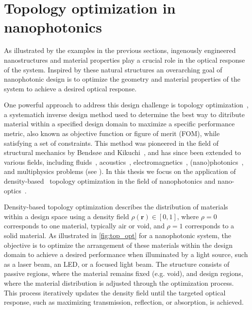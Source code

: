

\section{Topology optimization in nanophotonics}

As illustrated by the examples in the previous sections, ingenously engineered nanostructures and material properties play a crucial role in the
optical response of the system. Inspired by these natural structures an overarching goal of nanophotonic
design is to optimize the geometry and material properties of the system to achieve a desired
optical response.

One powerful approach to address this design challenge is topology optimization~\cite{topopt_book}, a systematich inverse design method used to determine the best way to ditribute 
material within a specified design domain to maximize a specific performance metric, also known as 
objective function or figure of merit (FOM), while satisfying a set of constraints. This method
was pioneered in the field of structural mechanics by Bendsøe and Kikuchi~\cite{bendsoe_kikukchi}, 
and has since been extended to various fields, including fluids~\cite{topopt_fluid}, acoustics~\cite{topopt_acoustic}, 
electromagnetics~\cite{topopt_EM}, (nano)photonics~\cite{topopt_phot}, and multiphysics problems (see ). In this thesis we focus on the application of density-based~\cite{bendsoe_density, topopt_approaches} 
topology optimization in the field of nanophotonics and nano-optics~\cite{jensen_review}.

Density-based topology optimization describes the distribution of materials within a design space using a 
density field $\rho(\mathbf{r}) \in [0,1]$, where $\rho = 0$ corresponds to one material, typically air or void, and $\rho = 1$ corresponds to a solid material.
 As illustrated 
in \autoref{fig:top_opt} for a nanophotonic system, the objective is to optimize the arrangement of these materials within 
the design domain to achieve a desired performance when illuminated by a light source, such as a laser beam, an LED, or a focused light beam. 
The structure consists of passive regions, where the material remains fixed (e.g. void), and design regions, where the material distribution 
is adjusted through the optimization process. This process iteratively updates the density field until the targeted optical response, 
such as maximizing transmission, reflection, or absorption, is achieved.

